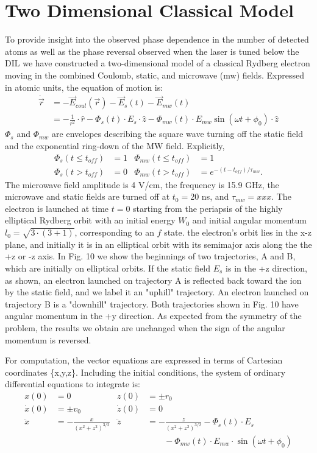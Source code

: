\documentclass[aps,pra,preprint,groupedaddress]{revtex4-1}
\begin{document}
\section{\label{sec:2DMod} Two Dimensional Classical Model}

To provide insight into the observed phase dependence in the number of detected atoms as well as the phase reversal observed when the laser is tuned below the DIL we have constructed a two-dimensional model of a classical Rydberg electron moving in the combined Coulomb, static, and microwave (mw) fields. Expressed in atomic units, the equation of motion is:
\begin{align*}
\ddot{\vec{r}} & = -\vec{E}_{coul}(\vec{r}) - \vec{E}_{s}(t) - \vec{E}_{mw}(t) \\
 & = -\frac{1}{r^2} \cdot \hat{r} - \Phi_s(t) \cdot E_{s} \cdot \hat{z} - \Phi_{mw}(t) \cdot E_{mw} \sin{(\omega t + \phi_0)} \cdot \hat{z}
\end{align*}
$\Phi_s$ and $\Phi_{mw}$ are envelopes describing the square wave turning off the static  field and the exponential ring-down of the MW field. Explicitly,
\begin{align*}
\Phi_s(t \leq t_{off}) & = 1 & \Phi_{mw}(t \leq t_{off}) & = 1 \\
\Phi_s(t > t_{off}) & = 0 & \Phi_{mw}(t > t_{off}) & = e^{-(t-t_{off})/\tau_{mw}}.
\end{align*}
The microwave field amplitude is 4 V/cm, the frequency is 15.9 GHz, the microwave and static fields are turned off at $t_0=$20 ns, and $\tau_{mw}=xxx$. The electron is launched at time $t=0$ starting from the periapsis of the highly elliptical Rydberg orbit with an initial energy $W_0$ and initial angular momentum $l_0 = \sqrt{3 \cdot (3+1)}$, corresponding to an $f$ state. the electron's orbit lies in the x-z plane, and initially it is in an elliptical orbit with its semimajor axis along the the +z or -z axis. In Fig. 10 we show the beginnings of two trajectories, A and B, which are initially on elliptical orbits. If the static field $E_s$ is in the +z direction, as shown, an electron launched on trajectory A is reflected back toward the ion by the static field, and we label it an "uphill" trajectory. An electron launched on trajectory B is a "downhill" trajectory. Both trajectories shown in Fig. 10 have angular momentum in the +y direction. As expected from the symmetry of the problem, the results we obtain are unchanged when the sign of the angular momentum is reversed.


For computation, the vector equations are expressed in terms of Cartesian coordinates \{x,y,z\}. Including the initial conditions, the system of ordinary differential equations to integrate is:
\begin{align*}
x(0) & = 0 & z(0) & = \pm r_0 \\
\dot{x}(0) & = \pm v_0 & \dot{z}(0) & = 0 \\
\ddot{x} & = -\frac{x}{(x^2 + z^2)^{3/2}} & \ddot{z} & = -\frac{z}{(x^2 + z^2)^{3/2}} - \Phi_s(t) \cdot E_s \\
 & & & \quad \quad - \Phi_{mw}(t) \cdot E_{mw} \cdot \sin{(\omega t + \phi_0)}
\end{align*}
\end{document}
